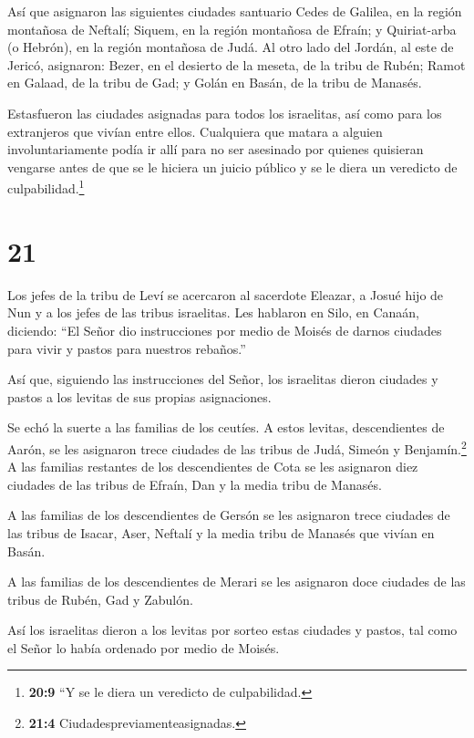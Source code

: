  Así que asignaron las siguientes ciudades santuario Cedes
de Galilea, en la región montañosa de Neftalí; Siquem, en la región
montañosa de Efraín; y Quiriat-arba (o Hebrón), en la región montañosa
de Judá.  Al otro lado del Jordán, al este de Jericó,
asignaron: Bezer, en el desierto de la meseta, de la tribu de Rubén;
Ramot en Galaad, de la tribu de Gad; y Golán en Basán, de la tribu de
Manasés.

 Estasfueron las ciudades asignadas para todos los
israelitas, así como para los extranjeros que vivían entre ellos.
Cualquiera que matara a alguien involuntariamente podía ir allí para no
ser asesinado por quienes quisieran vengarse antes de que se le hiciera
un juicio público y se le diera un veredicto de culpabilidad.\footnote{\textbf{20:9}
  ``Y se le diera un veredicto de culpabilidad.}

\hypertarget{section-20}{%
\section{21}\label{section-20}}

 Los jefes de la tribu de Leví se acercaron al sacerdote
Eleazar, a Josué hijo de Nun y a los jefes de las tribus israelitas.
 Les hablaron en Silo, en Canaán, diciendo: ``El Señor dio
instrucciones por medio de Moisés de darnos ciudades para vivir y pastos
para nuestros rebaños.''

 Así que, siguiendo las instrucciones del Señor, los
israelitas dieron ciudades y pastos a los levitas de sus propias
asignaciones.

 Se echó la suerte a las familias de los ceutíes. A estos
levitas, descendientes de Aarón, se les asignaron trece ciudades de las
tribus de Judá, Simeón y Benjamín.\footnote{\textbf{21:4}
  Ciudadespreviamenteasignadas.}  A las familias restantes
de los descendientes de Cota se les asignaron diez ciudades de las
tribus de Efraín, Dan y la media tribu de Manasés.

 A las familias de los descendientes de Gersón se les
asignaron trece ciudades de las tribus de Isacar, Aser, Neftalí y la
media tribu de Manasés que vivían en Basán.

 A las familias de los descendientes de Merari se les
asignaron doce ciudades de las tribus de Rubén, Gad y Zabulón.

 Así los israelitas dieron a los levitas por sorteo estas
ciudades y pastos, tal como el Señor lo había ordenado por medio de
Moisés.

